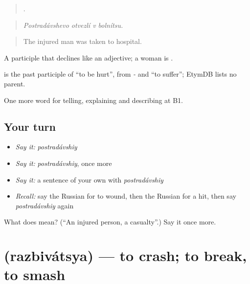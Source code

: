 \begin{quote}
   .
\end{quote}

\begin{quote}
\emph{Postradávshevo otvezlí v bolnítsu.}
\end{quote}

\begin{quote}
The injured man was taken to hospital.
\end{quote}

A participle that declines like an adjective; a woman is \emph{}.

\begin{cousinweb}
\emph{} is the past participle of \emph{} \textquotedblleft{}to be hurt\textquotedblright{}, from \emph{-} and \emph{} \textquotedblleft{}to suffer\textquotedblright{}; EtymDB lists no parent.
\end{cousinweb}

\begin{grammarlens}[title={What you've built}]
One more word for telling, explaining and describing at B1.
\end{grammarlens}

\subsection*{Your turn}
\begin{itemize}
\raggedright
  \item \emph{Say it:} \emph{postradávshiy}
  \item \emph{Say it:} \emph{postradávshiy}, once more
  \item \emph{Say it:} a sentence of your own with \emph{postradávshiy}
  \item \emph{Recall:} say the Russian for to wound, then the Russian for a hit, then say \emph{postradávshiy} again
\end{itemize}

\begin{tcolorbox}[breakable,colback=teal!4,colframe=teal!35!black,title={Before you move on}]
What does  mean? (\textquotedblleft{}An injured person, a casualty\textquotedblright{}.) Say it once more.
\end{tcolorbox}
\section[\texorpdfstring{\ru{разбиваться} (razbivátsya)}{разбиваться (razbivátsya)}]{ (razbivátsya) — to crash; to break, to smash}

